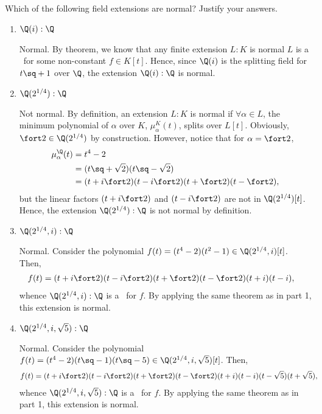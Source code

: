 \documentclass{article}
\begin{document}
\setcounter{section}{5} %
\begin{exercise}
Which of the following field extensions are normal? Justify your answers.
\end{exercise}
\begin{enumerate}
\item \( \Q(i):\Q \) %
\begin{solution}
Normal.
By theorem, we know that any finite extension \( L:K \) is normal \iff \( L \) is a \sfe~for some non-constant \( f\in K[t] \).
Hence, since \( \Q(i) \) is the splitting field for \( t\sq+1 \) over \( \Q \), the extension \( \Q(i):\Q \) is normal.
\end{solution}

\item \( \Q(2^{1/4}):\Q \) %
\begin{solution}
Not normal.
By definition, an extension \( L:K \) is normal if \( \forall \alpha\in L \), the minimum polynomial of \( \alpha \) over \( K \), \( \mu_\alpha^K(t) \), splits over \( L[t] \).
Obviously, \( \fort 2 \in \Q(2^{1/4}) \) by construction.
However, notice that for \( \alpha=\fort 2 \), \begin{align*}
  \mu_\alpha^\Q(t) &= t^4-2 \\
  &= (t\sq+\sqrt 2)(t\sq-\sqrt 2) \\
  &= (t+i\fort 2)(t-i\fort 2)(t+\fort 2)(t-\fort 2),
\end{align*}
but the linear factors \( (t+i\fort 2) \) and \( (t-i\fort 2) \) are not in \( \Q(2^{1/4})[t] \). Hence, the extension \( \Q(2^{1/4}):\Q \) is not normal by definition.
\end{solution}

\item \( \Q(2^{1/4},i):\Q \) %
\begin{solution}
Normal.
Consider the polynomial \( f(t) = (t^4-2)(t^2-1) \in \Q(2^{1/4},i)[t] \).
Then, \begin{align*}
  f(t) &= (t+i\fort 2)(t-i\fort 2)(t+\fort 2)(t-\fort 2)(t+i)(t-i),
\end{align*}
whence \( \Q(2^{1/4},i):\Q \) is a \sfe~for \( f \).
By applying the same theorem as in part 1, this extension is normal.
\end{solution}

\item \( \Q(2^{1/4},i,\sqrt 5):\Q \) %
\begin{solution}
Normal.
Consider the polynomial \( f(t) = (t^4-2)(t\sq-1)(t\sq-5) \in \Q(2^{1/4},i,\sqrt 5)[t] \).
Then, \begin{align*}
  f(t) &= (t+i\fort 2)(t-i\fort 2)(t+\fort 2)(t-\fort 2)(t+i)(t-i)(t-\sqrt 5)(t+\sqrt 5),
\end{align*}
whence \( \Q(2^{1/4},i,\sqrt 5):\Q \) is a \sfe~for \( f \).
By applying the same theorem as in part 1, this extension is normal.
\end{solution}


\end{enumerate}
\end{document}
